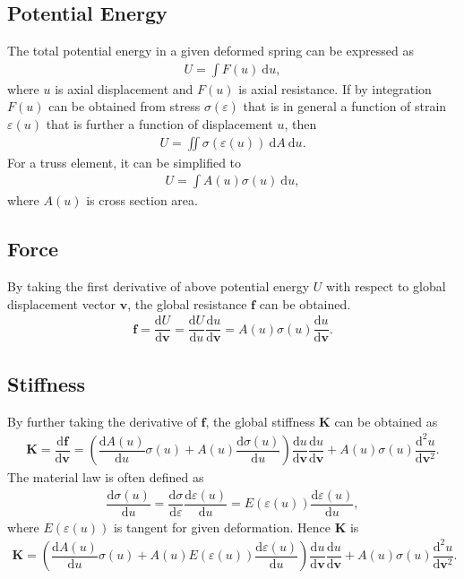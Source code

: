 \documentclass[11pt]{article}
\begin{document}
\subsection{Potential Energy}
The total potential energy in a given deformed spring can be expressed as
\begin{gather}
U=\int{}F(u)~\mathrm{d}u,
\end{gather}
where $u$ is axial displacement and $F(u)$ is axial resistance. If by integration $F(u)$ can be obtained from stress $\sigma(\varepsilon)$ that is in general a function of strain $\varepsilon(u)$ that is further a function of displacement $u$, then
\begin{gather}
U=\iint\sigma(\varepsilon(u))~\mathrm{d}A~\mathrm{d}u.
\end{gather}
For a truss element, it can be simplified to
\begin{gather}
U=\int{}A(u)\sigma(u)~\mathrm{d}u,
\end{gather}
where $A(u)$ is cross section area.
\subsection{Force}
By taking the first derivative of above potential energy $U$ with respect to global displacement vector $\mathbf{v}$, the global resistance $\mathbf{f}$ can be obtained.
\begin{gather}
\mathbf{f}=\dfrac{\mathrm{d}U}{\mathrm{d}\mathbf{v}}=\dfrac{\mathrm{d}U}{\mathrm{d}u}\dfrac{\mathrm{d}u}{\mathrm{d}\mathbf{v}}=A(u)\sigma(u)\dfrac{\mathrm{d}u}{\mathrm{d}\mathbf{v}}.
\end{gather}
\subsection{Stiffness}
By further taking the derivative of $\mathbf{f}$, the global stiffness $\mathbf{K}$ can be obtained as
\begin{gather}
\mathbf{K}=\dfrac{\mathrm{d}\mathbf{f}}{\mathrm{d}\mathbf{v}}=\left(\dfrac{\mathrm{d}A(u)}{\mathrm{d}u}\sigma(u)+A(u)\dfrac{\mathrm{d}\sigma(u)}{\mathrm{d}u}\right)\dfrac{\mathrm{d}u}{\mathrm{d}\mathbf{v}}\dfrac{\mathrm{d}u}{\mathrm{d}\mathbf{v}}+A(u)\sigma(u)\dfrac{\mathrm{d}^2u}{\mathrm{d}\mathbf{v}^2}.
\end{gather}
The material law is often defined as
\begin{gather}
\dfrac{\mathrm{d}\sigma(u)}{\mathrm{d}u}=\dfrac{\mathrm{d}\sigma}{\mathrm{d}\varepsilon}\dfrac{\mathrm{d}\varepsilon(u)}{\mathrm{d}u}=E(\varepsilon(u))\dfrac{\mathrm{d}\varepsilon(u)}{\mathrm{d}u},
\end{gather}
where $E(\varepsilon(u))$ is tangent for given deformation. Hence $\mathbf{K}$ is
\begin{gather}
\mathbf{K}=\left(\dfrac{\mathrm{d}A(u)}{\mathrm{d}u}\sigma(u)+A(u)E(\varepsilon(u))\dfrac{\mathrm{d}\varepsilon(u)}{\mathrm{d}u}\right)\dfrac{\mathrm{d}u}{\mathrm{d}\mathbf{v}}\dfrac{\mathrm{d}u}{\mathrm{d}\mathbf{v}}+A(u)\sigma(u)\dfrac{\mathrm{d}^2u}{\mathrm{d}\mathbf{v}^2}.
\end{gather}
\end{document}
